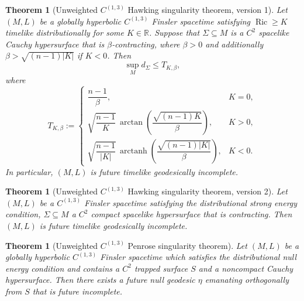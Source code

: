 \documentclass[a4paper,11pt]{article}
\numberwithin{equation}{section}
\theoremstyle{definition}
\theoremstyle{plain}
\newtheorem{Theorem}[Definition]{Theorem}
\begin{document}
\begin{Theorem}[Unweighted $C^{(1,3)}$ Hawking singularity theorem,
version 1]
Let $(M,L)$ be a globally hyperbolic $C^{(1,3)}$
Finsler spacetime satisfying
$\operatorname{Ric}\geq K$ timelike distributionally
for some $K\in\mathbb R$.
Suppose that $\Sigma\subseteq M$ is a $C^2$ spacelike
Cauchy hypersurface that is $\beta$-contracting,
where $\beta>0$ and additionally
$\beta>\sqrt{(n-1)|K|}$ if $K<0$. Then
\begin{equation*}
    \sup_M d_\Sigma\leq T_{K,\beta},
\end{equation*}
where 
\begin{equation*}
    T_{K,\beta}:=
    \begin{cases}
        \dfrac{n-1}{\beta},
        & K=0,\\[1.2ex]
        \sqrt{\dfrac{n-1}{K}}\,
        \operatorname{arctan}\!
        \left(\dfrac{\sqrt{(n-1)K}}{\beta}\right),
        & K>0,\\[1.6ex]
        \sqrt{\dfrac{n-1}{|K|}}\,
        \operatorname{arctanh}\!
        \left(\dfrac{\sqrt{(n-1)|K|}}{\beta}\right),
        & K<0.
    \end{cases}
\end{equation*}
In particular, $(M,L)$ is future timelike geodesically
incomplete.
\end{Theorem}

\begin{Theorem}[Unweighted $C^{(1,3)}$ Hawking singularity theorem, version 2]
Let $(M,L)$ be a $C^{(1,3)}$ Finsler spacetime satisfying the distributional strong energy condition, $\Sigma \subseteq M$ a $C^2$ compact spacelike hypersurface that is contracting. 
Then $(M,L)$ is future timelike geodesically incomplete.
\end{Theorem}

\begin{Theorem}[Unweighted $C^{(1,3)}$ Penrose singularity theorem]
Let $(M,L)$ be a globally hyperbolic $C^{(1,3)}$ Finsler spacetime which satisfies the distributional null energy condition and contains a $C^2$ trapped surface $S$ and a noncompact Cauchy hypersurface. 
Then there exists a future null geodesic $\eta$ emanating orthogonally from $S$ that is future incomplete.
\end{Theorem}
\end{document}
